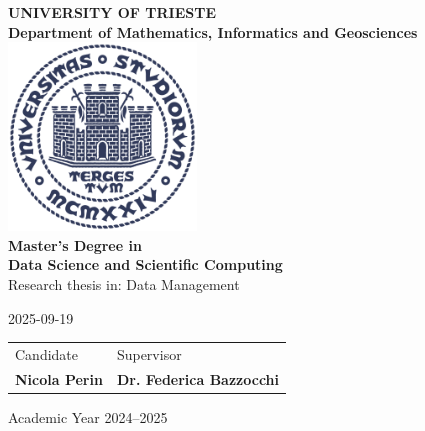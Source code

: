 \begin{titlepage}
	\begin{center}
		{\LARGE {\bfseries UNIVERSITY OF TRIESTE \\}}
		{\Large {\bfseries Department of Mathematics, Informatics and Geosciences\\}}
		\vspace{1cm}
		\includegraphics[width=5cm,height=5cm]{img/units_logo.png}\\[1cm]
		
		\vfill
		{\Large \bfseries Master's Degree in\\}
		{\LARGE \bfseries Data Science and Scientific Computing \\}
		{\Large Research thesis in: Data Management \\}
		\vspace{1cm}
		
		{\huge \bfseries \thetitle}
		\vspace{1cm}
		
		{\large 2025-09-19 \\[1cm]}
		
		{\Large
			\setlength{\tabcolsep}{32pt}
			\begin{tabularx}{\linewidth}{ >{\raggedleft}X >{\raggedright\arraybackslash}X}
				Candidate & Supervisor \\
				\bfseries Nicola Perin & \bfseries Dr. Federica Bazzocchi\\ [5mm]
			\end{tabularx}
		}
		
		\vfill
		{\Large Academic Year 2024--2025}
	\end{center}
\end{titlepage}

\ClearShipoutPicture
\newgeometry{}
